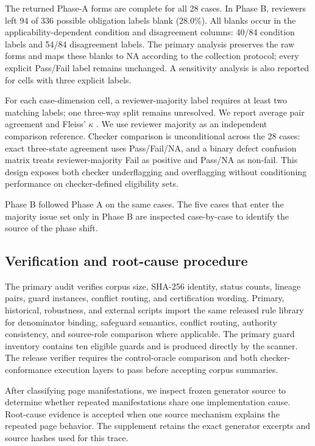 \documentclass[a4paper,fleqn]{cas-dc}
\begin{document}
The returned Phase-A forms are complete for all 28 cases. In Phase B, reviewers left 94 of 336 possible obligation labels blank (28.0\%). All blanks occur in the applicability-dependent condition and disagreement columns: 40/84 condition labels and 54/84 disagreement labels. The primary analysis preserves the raw forms and maps these blanks to NA according to the collection protocol; every explicit Pass/Fail label remains unchanged. A sensitivity analysis is also reported for cells with three explicit labels.

For each case-dimension cell, a reviewer-majority label requires at least two matching labels; one three-way split remains unresolved. We report average pair agreement and Fleiss' $\kappa$ \citep{Fleiss1971}. We use reviewer majority as an independent comparison reference. Checker comparison is unconditional across the 28 cases: exact three-state agreement uses Pass/Fail/NA, and a binary defect confusion matrix treats reviewer-majority Fail as positive and Pass/NA as non-fail. This design exposes both checker underflagging and overflagging without conditioning performance on checker-defined eligibility sets.

Phase B followed Phase A on the same cases. The five cases that enter the majority issue set only in Phase B are inspected case-by-case to identify the source of the phase shift.

\subsection{Verification and root-cause procedure}
The primary audit verifies corpus size, SHA-256 identity, status counts, lineage pairs, guard instances, conflict routing, and certification wording. Primary, historical, robustness, and external scripts import the same released rule library for denominator binding, safeguard semantics, conflict routing, authority consistency, and source-role comparison where applicable. The primary guard inventory contains ten eligible guards and is produced directly by the scanner. The release verifier requires the control-oracle comparison and both checker-conformance execution layers to pass before accepting corpus summaries.

After classifying page manifestations, we inspect frozen generator source to determine whether repeated manifestations share one implementation cause. Root-cause evidence is accepted when one source mechanism explains the repeated page behavior. The supplement retains the exact generator excerpts and source hashes used for this trace.
\end{document}
